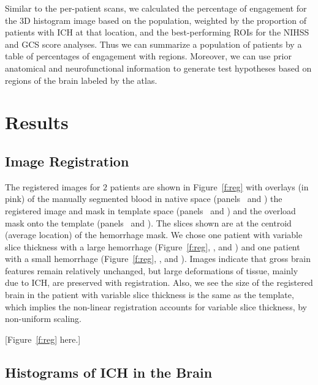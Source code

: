 \documentclass[10pt]{article}\usepackage[]{graphicx}\usepackage[]{color}
\begin{document}
Similar to the per-patient scans, we calculated the percentage of engagement for the 3D histogram image based on the population, weighted by the proportion of patients with ICH at that location, and the best-performing ROIs for the NIHSS and GCS score analyses.  
Thus we can summarize a population of patients by a table of percentages of engagement with regions.  Moreover, we can use prior anatomical and neurofunctional information to generate test hypotheses based on regions of the brain labeled by the atlas.



\section*{Results}


\subsection*{Image Registration}

The registered images for $2$ patients are shown in Figure~\ref{f:reg} with overlays (in pink) of the manually segmented blood in native space (panels~\protect{} and \protect{}) the registered image and mask in template space (panels~\protect{} and \protect{}) and the overload mask onto the template (panels~\protect{} and \protect{}).  The slices shown are at the centroid (average location) of the hemorrhage mask.  We chose one patient with variable slice thickness with a large hemorrhage (Figure~\ref{f:reg}\protect{}, \protect{}, and \protect{}) and one patient with a small hemorrhage (Figure~\ref{f:reg}\protect{}, \protect{}, and \protect{}).  Images indicate that gross brain features remain relatively unchanged, but large deformations of tissue, mainly due to ICH, are preserved with registration.  Also, we see the size of the registered brain in the patient with variable slice thickness is the same as the template, which implies the non-linear registration accounts for variable slice thickness, by non-uniform scaling.

[Figure~\ref{f:reg} here.]


\subsection*{Histograms of ICH in the Brain}
\end{document}
